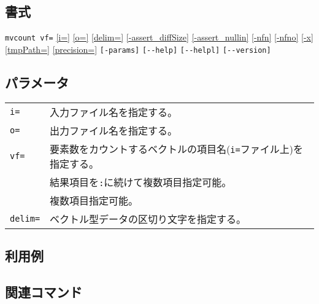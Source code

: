 \subsection*{書式}
\verb|mvcount vf=|
\hyperref[sect:option_i]{[i=]}
\hyperref[sect:option_o]{[o=]}
\hyperref[sect:option_delim]{[delim=]} 
\hyperref[sect:option_assert_diffSize]{[-assert\_diffSize]}
\hyperref[sect:option_assert_nullin]{[-assert\_nullin]}
\hyperref[sect:option_nfn]{[-nfn]} 
\hyperref[sect:option_nfno]{[-nfno]}  
\hyperref[sect:option_x]{[-x]}
\hyperref[sect:option_option_tmppath]{[tmpPath=]}
\hyperref[sect:option_precision]{[precision=]}
\verb|[-params]|
\verb|[--help]|
\verb|[--helpl]|
\verb|[--version]|\\

\subsection*{パラメータ}
\begin{table}[htbp]
{\small
\begin{tabular}{ll}
\verb|i=|    & 入力ファイル名を指定する。\\
\verb|o=|    & 出力ファイル名を指定する。\\
\verb|vf=| & 要素数をカウントするベクトルの項目名(\verb|i=|ファイル上)を指定する。\\
           & 結果項目を\verb|:|に続けて複数項目指定可能。\\
           & 複数項目指定可能。\\
\verb|delim=| & ベクトル型データの区切り文字を指定する。\\
\end{tabular}
}
\end{table} 

\subsection*{利用例}

\subsection*{関連コマンド}

%
